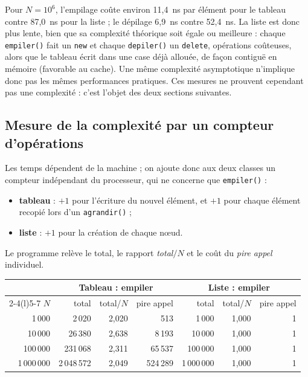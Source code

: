 \documentclass[11pt,a4paper]{article}
\begin{document}
Pour $N=10^6$, l'empilage coûte environ 11,4~ns par élément pour le tableau contre 87,0~ns pour la liste ; le dépilage 6,9~ns contre 52,4~ns. La liste est donc plus lente, bien que sa complexité théorique soit égale ou meilleure : chaque \texttt{empiler()} fait un \texttt{new} et chaque \texttt{depiler()} un \texttt{delete}, opérations coûteuses, alors que le tableau écrit dans une case déjà allouée, de façon contiguë en mémoire (favorable au cache). Une même complexité asymptotique n'implique donc pas les mêmes performances pratiques. Ces mesures ne prouvent cependant pas une complexité : c'est l'objet des deux sections suivantes.

\subsection{Mesure de la complexité par un compteur d'opérations}\label{sec:compteur}

Les temps dépendent de la machine ; on ajoute donc aux deux classes un compteur indépendant du processeur, qui ne concerne que \texttt{empiler()} :

\begin{itemize}[nosep]
    \item \textbf{tableau} : $+1$ pour l'écriture du nouvel élément, et $+1$ pour chaque élément recopié lors d'un \texttt{agrandir()} ;
    \item \textbf{liste} : $+1$ pour la création de chaque nœud.
\end{itemize}

Le programme relève le total, le rapport \emph{total}$/N$ et le coût du \emph{pire appel} individuel.

\begin{center}
\renewcommand{\arraystretch}{1.2}
\begin{tabular}{@{}r rrr rrr@{}}
\toprule
& \multicolumn{3}{c}{Tableau : empiler} & \multicolumn{3}{c}{Liste : empiler} \\
\cmidrule(lr){2-4}\cmidrule(l){5-7}
$N$ & total & total/$N$ & pire appel & total & total/$N$ & pire appel \\
\midrule
1\,000      & 2\,020     & 2,020 & 513     & 1\,000     & 1,000 & 1 \\
10\,000     & 26\,380    & 2,638 & 8\,193  & 10\,000    & 1,000 & 1 \\
100\,000    & 231\,068   & 2,311 & 65\,537 & 100\,000   & 1,000 & 1 \\
1\,000\,000 & 2\,048\,572 & 2,049 & 524\,289 & 1\,000\,000 & 1,000 & 1 \\
\bottomrule
\end{tabular}
\end{center}
\end{document}
